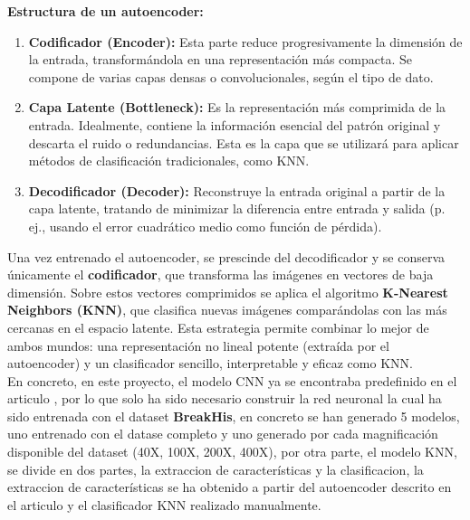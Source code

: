 \documentclass[12pt]{article} %
\begin{document}
\textbf{Estructura de un autoencoder:}
\begin{enumerate}
    \item \textbf{Codificador (Encoder):} Esta parte reduce progresivamente la dimensión de la entrada, transformándola en una representación más compacta. Se compone de varias capas densas o convolucionales, según el tipo de dato.
    \item \textbf{Capa Latente (Bottleneck):} Es la representación más comprimida de la entrada. Idealmente, contiene la información esencial del patrón original y descarta el ruido o redundancias. Esta es la capa que se utilizará para aplicar métodos de clasificación tradicionales, como KNN.
    \item \textbf{Decodificador (Decoder):} Reconstruye la entrada original a partir de la capa latente, tratando de minimizar la diferencia entre entrada y salida (p. ej., usando el error cuadrático medio como función de pérdida).
\end{enumerate}

Una vez entrenado el autoencoder, se prescinde del decodificador y se conserva únicamente el \textbf{codificador}, que transforma las imágenes en vectores de baja dimensión. Sobre estos vectores comprimidos se aplica el algoritmo \textbf{K-Nearest Neighbors (KNN)}, que clasifica nuevas imágenes comparándolas con las más cercanas en el espacio latente. Esta estrategia permite combinar lo mejor de ambos mundos: una representación no lineal potente (extraída por el autoencoder) y un clasificador sencillo, interpretable y eficaz como KNN.\\

En concreto, en este proyecto, el modelo CNN ya se encontraba predefinido en el articulo \cite{bardou2018classification}, por lo que solo ha sido necesario construir la red neuronal la cual ha sido entrenada con el dataset \textbf{BreakHis}, en concreto se han generado 5 modelos, uno entrenado con el datase completo y uno generado por cada magnificación disponible del dataset (40X, 100X, 200X, 400X), por otra parte, el modelo KNN, se divide en dos partes, la extraccion de características y la clasificacion, la extraccion de características se ha obtenido a partir del autoencoder descrito en el articulo \cite{minarno2021cnn} y el clasificador KNN realizado manualmente.

\newpage
\end{document}
